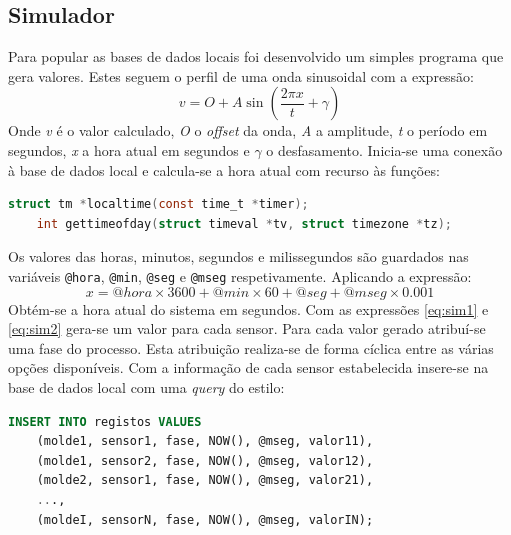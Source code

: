 \documentclass[11pt,twoside,a4paper]{report}
\begin{document}
\subsection{Simulador}
Para popular as bases de dados locais foi desenvolvido um simples programa que gera valores. Estes seguem o perfil de uma onda sinusoidal com a expressão:
\begin{equation}
v = O + A\sin(\frac{2 \pi x}{t} + \gamma)
\label{eq:sim1}
\end{equation}
Onde \textit{v} é o valor calculado, \textit{O} o \textit{offset} da onda, \textit{A} a amplitude, \textit{t} o período em segundos, \textit{x} a hora atual em segundos e $ \gamma $ o desfasamento. Inicia-se uma conexão à base de dados local e calcula-se a hora atual com recurso às funções:
\begin{lstlisting}[language = C]
	struct tm *localtime(const time_t *timer);
	int gettimeofday(struct timeval *tv, struct timezone *tz);
\end{lstlisting}
Os valores das horas, minutos, segundos e milissegundos são guardados nas variáveis \texttt{@hora}, \texttt{@min}, \texttt{@seg} e \texttt{@mseg} respetivamente. Aplicando a expressão:
\begin{equation}
x = @hora \times 3600 + @min \times 60 + @seg + @mseg \times 0.001
\label{eq:sim2}
\end{equation}
Obtém-se a hora atual do sistema em segundos. Com as expressões \ref{eq:sim1} e \ref{eq:sim2} gera-se um valor para cada sensor. Para cada valor gerado atribuí-se uma fase do processo. Esta atribuição realiza-se de forma cíclica entre as várias opções disponíveis. Com a informação de cada sensor estabelecida insere-se na base de dados local com uma \textit{query} do estilo:
\begin{lstlisting}[language = SQL]
	INSERT INTO registos VALUES
	(molde1, sensor1, fase, NOW(), @mseg, valor11),
	(molde1, sensor2, fase, NOW(), @mseg, valor12),
	(molde2, sensor1, fase, NOW(), @mseg, valor21),
	...,
	(moldeI, sensorN, fase, NOW(), @mseg, valorIN);
\end{lstlisting}
\end{document}
